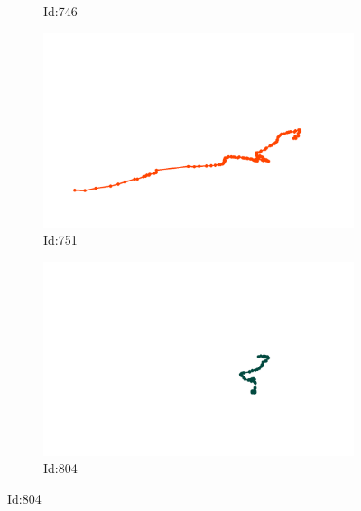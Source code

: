 \documentclass[12pt,twoside]{report}
\begin{document}
\begin{figure}
\begin{subfigure}[b]{0.20\textwidth}
\caption{Id:746}
\end{subfigure}
\begin{subfigure}[b]{0.20\textwidth}
\centering
\includegraphics[width=\textwidth]{../trajectories/751.png}
\caption{Id:751}
\end{subfigure}
\begin{subfigure}[b]{0.20\textwidth}
\centering
\includegraphics[width=\textwidth]{../trajectories/804.png}
\caption{Id:804}
\end{subfigure}
\end{figure}
\end{document}

